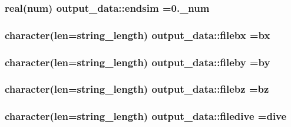 \subsubsection[{\texorpdfstring{endsim}{endsim}}]{\setlength{\rightskip}{0pt plus 5cm}real(num) output\+\_\+data\+::endsim =0.\+\_\+num}\hypertarget{namespaceoutput__data_a1ed464801538daa68f0f138d06be9c8a}{}\label{namespaceoutput__data_a1ed464801538daa68f0f138d06be9c8a}
\subsubsection[{\texorpdfstring{filebx}{filebx}}]{\setlength{\rightskip}{0pt plus 5cm}character(len=string\+\_\+length) output\+\_\+data\+::filebx =\textquotesingle{}bx\textquotesingle{}}\hypertarget{namespaceoutput__data_ac0a6ec606c33d1bc037b5ce85a9f4b3a}{}\label{namespaceoutput__data_ac0a6ec606c33d1bc037b5ce85a9f4b3a}
\subsubsection[{\texorpdfstring{fileby}{fileby}}]{\setlength{\rightskip}{0pt plus 5cm}character(len=string\+\_\+length) output\+\_\+data\+::fileby =\textquotesingle{}by\textquotesingle{}}\hypertarget{namespaceoutput__data_ac6e874f0a8121e42bed35e449a4a7c38}{}\label{namespaceoutput__data_ac6e874f0a8121e42bed35e449a4a7c38}
\subsubsection[{\texorpdfstring{filebz}{filebz}}]{\setlength{\rightskip}{0pt plus 5cm}character(len=string\+\_\+length) output\+\_\+data\+::filebz =\textquotesingle{}bz\textquotesingle{}}\hypertarget{namespaceoutput__data_a07a77b208c10f32c5723378f16ea4301}{}\label{namespaceoutput__data_a07a77b208c10f32c5723378f16ea4301}
\subsubsection[{\texorpdfstring{filedive}{filedive}}]{\setlength{\rightskip}{0pt plus 5cm}character(len=string\+\_\+length) output\+\_\+data\+::filedive =\textquotesingle{}dive\textquotesingle{}}\hypertarget{namespaceoutput__data_a655183a11c6badb83f94a4f05b94f95e}{}\label{namespaceoutput__data_a655183a11c6badb83f94a4f05b94f95e}
